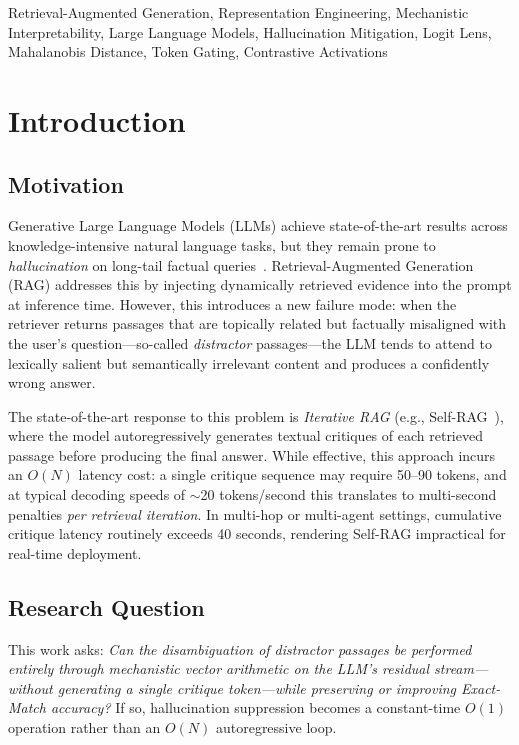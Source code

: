 \documentclass[conference]{IEEEtran}
\begin{document}
\begin{IEEEkeywords}
Retrieval-Augmented Generation, Representation Engineering, Mechanistic Interpretability, Large Language Models, Hallucination Mitigation, Logit Lens, Mahalanobis Distance, Token Gating, Contrastive Activations
\end{IEEEkeywords}

\section{Introduction}

\subsection{Motivation}

Generative Large Language Models (LLMs) achieve state-of-the-art results across knowledge-intensive natural language tasks, but they remain prone to \emph{hallucination} on long-tail factual queries~\cite{gao2024rag, saxena2024hallucination}. Retrieval-Augmented Generation (RAG) addresses this by injecting dynamically retrieved evidence into the prompt at inference time. However, this introduces a new failure mode: when the retriever returns passages that are topically related but factually misaligned with the user's question---so-called \emph{distractor} passages---the LLM tends to attend to lexically salient but semantically irrelevant content and produces a confidently wrong answer.

The state-of-the-art response to this problem is \emph{Iterative RAG} (e.g., Self-RAG~\cite{asai2023selfrag}), where the model autoregressively generates textual critiques of each retrieved passage before producing the final answer. While effective, this approach incurs an $O(N)$ latency cost: a single critique sequence may require 50--90 tokens, and at typical decoding speeds of $\sim$20 tokens/second this translates to multi-second penalties \emph{per retrieval iteration}. In multi-hop or multi-agent settings, cumulative critique latency routinely exceeds 40 seconds, rendering Self-RAG impractical for real-time deployment.

\subsection{Research Question}

This work asks: \emph{Can the disambiguation of distractor passages be performed entirely through mechanistic vector arithmetic on the LLM's residual stream---without generating a single critique token---while preserving or improving Exact-Match accuracy?} If so, hallucination suppression becomes a constant-time $O(1)$ operation rather than an $O(N)$ autoregressive loop.
\end{document}
